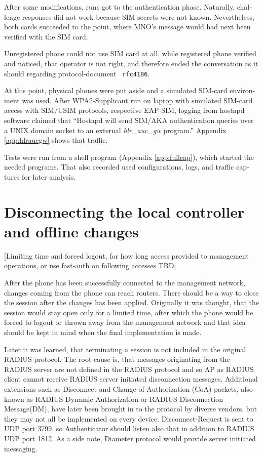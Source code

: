 \documentclass[12pt,a4paper,english]{tutthesis}
\begin{document}
\begin{otherlanguage}{english}
After some modifications, runs got to the authentication phase.
Naturally, challenge-responses did not work because SIM secrets were
not known. Nevertheless, both cards succeeded to the point, where MNO's
message would had next been verified with the SIM card.

Unregistered phone could not use SIM card at all, while 
registered phone verified and noticed, that operator is not right, 
and therefore ended the conversation as it should regarding
protocol-document \texttt{ rfc4186}.

At this point, physical phones were put aside and a simulated SIM-card
environment was used.
After WPA2-Supplicant run on laptop with simulated SIM-card access 
with SIM/USIM protocols, respective EAP-SIM, logging 
from hostapd software claimed that ``Hostapd will send SIM/AKA authentication
queries over a UNIX domain socket to an external 
\emph{hlr\_auc\_gw} program.''
Appendix \ref{app:hlraucgw}   shows that traffic.

Tests were run from a shell program (Appendix \ref{app:fulleap}), which
started the needed programs. That also recorded used configurations, logs,
and traffic captures for later analysis.


\section{Disconnecting the local controller and offline changes}
\label{sec-5-3}
\label{sec:disconnections}
[Limiting time and forced logout, for how long access provided to
management operations, or use fast-auth on following accesses TBD]

After the phone has been successfully connected to the management network,
changes coming from 
the phone can reach routers.  There should be a way to close the session after
the changes has been applied. Originally it was thought, that the session
would stay open only for a limited time, after which the phone would be forced to
logout or thrown away from the management network and that idea should be
kept in mind when the final implementation is made.





Later it was learned, that terminating a session is not included in the original RADIUS protocol.
The root cause is, that messages originating from the RADIUS server
are not defined in the RADIUS protocol and so AP as RADIUS client cannot
receive RADIUS server initiated disconnection messages. 
Additional
extensions such as Disconnect and Change-of-Authorization (CoA)
packets, also known as RADIUS Dynamic Authorization or RADIUS
Disconnection Message(DM), have later been brought in\cite{rfc5176}
to the protocol by diverse vendors, but they may not all be implemented on
every device.
Disconnect-Request is sent to UDP port 3799, so Authenticator should
listen also that in addition to RADIUS UDP port 1812.
As a side note, Diameter protocol would provide server initiated messaging.













\end{otherlanguage}
\end{document}
